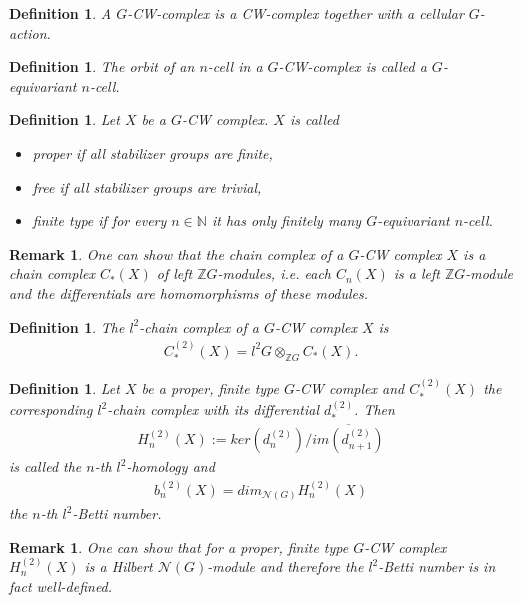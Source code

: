 \documentclass[12pt,a4paper]{scrartcl}
\newtheorem{Definition}[Theorem]{Definition}
\newtheorem{Remark}[Theorem]{Remark}
\numberwithin{equation}{section}
\newcommand{\Z}{\mathbb{Z}} %
\newcommand{\N}{\mathbb{N}} %
\newcommand{\2}{\mathbb{Z} / 2 \mathbb{Z}}
\newcommand{\1}{\bar{1}}
\newcommand{\0}{\bar{0}}
\begin{document}
\begin{Definition}
	A $G$-CW-complex is a CW-complex together with a cellular $G$-action.
\end{Definition}

\begin{Definition}
	The orbit of an $n$-cell in a $G$-CW-complex is called a $G$-equivariant $n$-cell.
\end{Definition}

\begin{Definition}
	Let $X$ be a $G$-CW complex. $X$ is called
	\begin{itemize}
		\item proper if all stabilizer groups are finite,
		\item free if all stabilizer groups are trivial,
		\item finite type if for every $n \in \N$ it has only finitely many $G$-equivariant $n$-cell.
	\end{itemize}
\end{Definition}
\begin{Remark}
	One can show that the chain complex of a $G$-CW complex $X$ is a chain complex $C_*(X)$ of left $\Z G$-modules, i.e. each $C_n(X)$ is a left $\Z G$-module and the differentials are homomorphisms of these modules.
\end{Remark}
\begin{Definition}
	The $l^2$-chain complex of a $G$-CW complex $X$ is
	\begin{align*}
		C_*^{(2)}(X) = l^2G \otimes_{\Z G} C_*(X).
	\end{align*}
\end{Definition}

\begin{Definition}
	Let $X$ be a proper, finite type $G$-CW complex and $C_*^{(2)}(X)$ the corresponding $l^2$-chain complex with its differential $d_*^{(2)}$. Then 
	\begin{align*}
		H_n^{(2)}(X) := ker(d_n^{(2)}) / \overline{im(d_{n+1}^{(2)})}
	\end{align*}
	is called the $n$-th $l^2$-homology and 
	\begin{align*}
		b_n^{(2)}(X)=dim_{\mathcal{N}(G)}H_n^{(2)}(X)
	\end{align*}
	the $n$-th $l^2$-Betti number.
\end{Definition}
\begin{Remark}
	One can show that for a proper, finite type $G$-CW complex $H_n^{(2)}(X)$ is a Hilbert $\mathcal{N}(G)$-module and therefore the $l^2$-Betti number is in fact well-defined.
\end{Remark}
\end{document}
